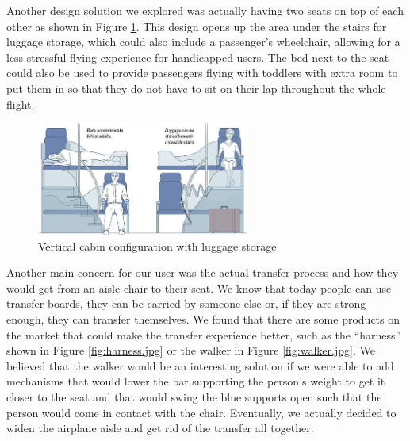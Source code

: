 Another design solution we explored was actually having two seats on top of each other as shown in Figure \ref{fig:vertical_with_luggage.jpg}. This design opens up the area under the stairs for luggage storage, which could also include a passenger's wheelchair, allowing for a less stressful flying experience for handicapped users. The bed next to the seat could also be used to provide passengers flying with toddlers with extra room to put them in so that they do not have to sit on their lap throughout the whole flight. 

\begin{figure}[h]
  \centering
     \includegraphics[width=7cm]{images/vertical_with_luggage.jpg}
   \caption{Vertical cabin configuration with luggage storage \cite{vertical_luggage}}%
  \label{fig:vertical_with_luggage.jpg}
\end{figure} 

Another main concern for our user was the actual transfer process and how they would get from an aisle chair to their seat. We know that today people can use transfer boards, they can be carried by someone else or, if they are strong enough, they can transfer themselves. We found that there are some products on the market that could make the transfer experience better, such as the “harness” shown in Figure \ref{fig:harness.jpg} or the walker in Figure \ref{fig:walker.jpg}. We believed that the walker would be an interesting solution if we were able to add mechanisms  that would lower the bar supporting the person's weight to get it closer to the seat and that would swing the blue supports open such that the person would come in contact with the chair. Eventually, we actually decided to widen the airplane aisle and get rid of the transfer all together. 

